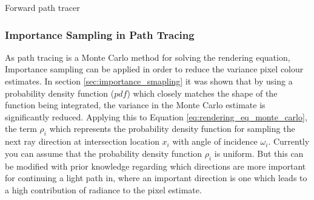 \documentclass[../dissertation.tex]{subfiles}
\begin{document}
\begin{algorithm}[H]
\label{alg:forward_path_tracing}
\SetAlgoLined
 \caption{Forward path tracer}
\end{algorithm}

\subsubsection{Importance Sampling in Path Tracing}

As path tracing is a Monte Carlo method for solving the rendering equation, Importance sampling can be applied in order to reduce the variance pixel colour estimates. In section \ref{sec:importance_smapling} it was shown that by using a probability density function ($pdf$) which closely matches the shape of the function being integrated, the variance in the Monte Carlo estimate is significantly reduced. Applying this to Equation \ref{eq:rendering_eq_monte_carlo}, the term $\rho_i$ which represents the probability density function for sampling the next ray direction at intersection location $x_i$ with angle of incidence $\omega_i$. Currently you can assume that the probability density function $\rho_i$ is uniform. But this can be modified with prior knowledge regarding which directions are more important for continuing a light path in, where an important direction is one which leads to a high contribution of radiance to the pixel estimate.\\
\end{document}
